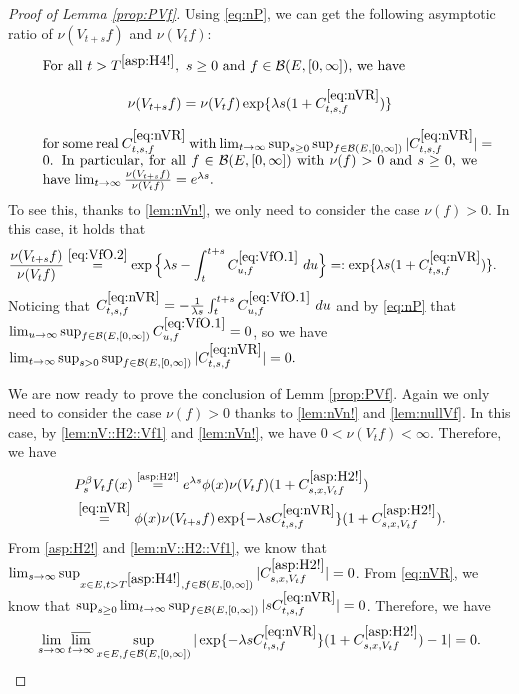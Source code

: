 \documentclass[12pt,a4paper]{amsart}
\numberwithin{equation}{section}
\theoremstyle{plain}
\theoremstyle{definition}
\theoremstyle{remark}
\begin{document}
\begin{proof}[Proof of Lemma \ref{prop:PVf}]
	Using \eqref{eq:nP}, we can get the following asymptotic ratio of $\nu(V_{t+s}f)$ and $\nu(V_tf)$:
\begin{equation} \label{eq:nVR}
\begin{minipage}{0.9\textwidth}
	For all $t> T^{\eqref{asp:H4!}},~s \geq 0$ and $f\in \mathcal B(E,[0,\infty])$, we have \[\nu(V_{t+s}f) = \nu(V_tf) \exp\{\lambda s (1+C^{\eqref{eq:nVR}}_{t,s,f}) \}\] for some real $C^{\eqref{eq:nVR}}_{t,s,f}$ with $\lim_{t\to \infty} \sup_{s\geq  0} \sup_{f\in \mathcal B(E,[0,\infty])} |C^{\eqref{eq:nVR}}_{t,s,f}| = 0$.
	In particular, for all $f\in \mathcal B(E,[0,\infty])$ with $\nu(f)>0$ and $s\geq 0$, we have $\lim_{t\to \infty} \frac{\nu(V_{t+s}f)}{\nu(V_tf)} = e^{\lambda s}$.
\end{minipage}
\end{equation}
	To see this, thanks to \eqref{lem:nVn!},
	we only need to consider the case $\nu(f)>0$. In this case,  it holds  that
\begin{align}
	&\frac{\nu(V_{t+s} f)} {\nu(V_t f)}
	\overset{\eqref{eq:VfO.2}}= \exp\Big\{\lambda s- \int_t^{t+s} C^{\eqref{eq:VfO.1}}_{u,f} ~du\Big\}
	=: \exp\{\lambda s (1+C^{\eqref{eq:nVR}}_{t,s,f}) \}.
\end{align}
	Noticing that $C^{\eqref{eq:nVR}}_{t,s,f} = -\frac{1}{\lambda s}\int_t^{t+s} C^{\eqref{eq:VfO.1}}_{u,f} ~du$ and by \eqref{eq:nP} that $\lim_{u\to \infty}\sup_{f\in \mathcal B(E,[0,\infty])} C^{\eqref{eq:VfO.1}}_{u,f} = 0$, 
	so we have $\lim_{t\to \infty} \sup_{s> 0}\sup_{f\in \mathcal B(E,[0,\infty])} |C^{\eqref{eq:nVR}}_{t,s,f}| = 0. $
	
	We are now  ready to prove the conclusion of Lemm \ref{prop:PVf}.
	Again we only need to consider the case $\nu(f)>0$ thanks to \eqref{lem:nVn!} and  \eqref{lem:nullVf}.
	In this case, by \eqref{lem:nV::H2::Vf1} and \eqref{lem:nVn!}, we have $0<\nu(V_{t}f)<\infty$.
	Therefore, we have
\begin{align}
	& P_s^\beta V_t f(x)
	\overset{\text{\eqref{asp:H2!}}}= e^{\lambda s} \phi(x) \nu(V_tf) (1+C^{\eqref{asp:H2!}}_{s,x,V_tf})
	\\&\overset{\eqref{eq:nVR}}= \phi(x) \nu(V_{t+s}f) \exp\{-\lambda s C^{\eqref{eq:nVR}}_{t,s,f}\} (1+C^{\eqref{asp:H2!}}_{s,x,V_tf}).
\end{align}
	From \eqref{asp:H2!} and \eqref{lem:nV::H2::Vf1}, we know that $\lim_{s\to \infty} \sup_{x\in E, t> T^{\eqref{asp:H4!}}, f\in \mathcal B(E,[0,\infty])} 
	|C^{\eqref{asp:H2!}}_{s,x,V_tf}| = 0$.
	From \eqref{eq:nVR}, we know that $\sup_{s\geq 0} \lim_{t\to \infty} \sup_{f\in \mathcal B(E,[0,\infty])}
	|sC^{\eqref{eq:nVR}}_{t,s,f}| = 0$.
	Therefore, we have 
	\[
	\lim_{s\to \infty}\varlimsup_{t\to \infty}\sup_{x\in E, f\in \mathcal B(E,[0,\infty])}
	|\exp\{-\lambda s C^{\eqref{eq:nVR}}_{t,s,f}\} (1+C^{\eqref{asp:H2!}}_{s,x,V_tf})-1| = 0. \qedhere\]
\end{proof}
\end{document}
